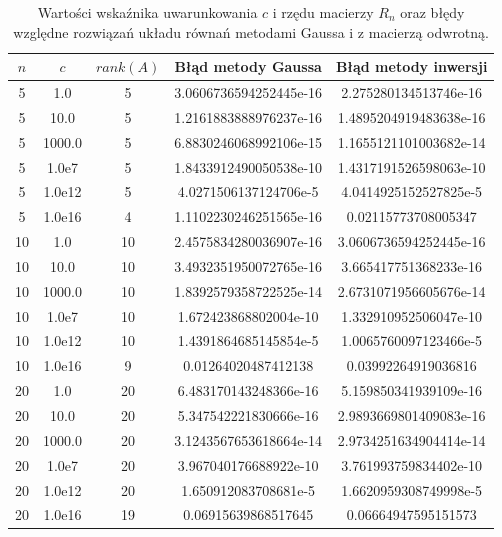 \documentclass{article}
\begin{document}
\begin{table}[H]
\begin{adjustbox}{center}
\begin{tabular}{|c|c|c|c|c|}
    \hline
    $n$ & $c$ & $rank(A)$ & Błąd metody Gaussa & Błąd metody inwersji\\
    \hline
    5 & 1.0 & 5 & 3.0606736594252445e-16 & 2.275280134513746e-16\\
    \hline
    5 & 10.0 & 5 & 1.2161883888976237e-16 & 1.4895204919483638e-16\\
    \hline
    5 & 1000.0 & 5 & 6.8830246068992106e-15 & 1.1655121101003682e-14\\
    \hline
    5 & 1.0e7 & 5 & 1.8433912490050538e-10 & 1.4317191526598063e-10\\
    \hline
    5 & 1.0e12 & 5 & 4.0271506137124706e-5 & 4.0414925152527825e-5\\
    \hline
    5 & 1.0e16 & 4 & 1.1102230246251565e-16 & 0.02115773708005347\\
    \hline
    10 & 1.0 & 10 & 2.4575834280036907e-16 & 3.0606736594252445e-16\\
    \hline
    10 & 10.0 & 10 & 3.4932351950072765e-16 & 3.665417751368233e-16\\
    \hline
    10 & 1000.0 & 10 & 1.8392579358722525e-14 & 2.6731071956605676e-14\\
    \hline
    10 & 1.0e7 & 10 & 1.672423868802004e-10 & 1.332910952506047e-10\\
    \hline
    10 & 1.0e12 & 10 & 1.4391864685145854e-5 & 1.0065760097123466e-5\\
    \hline
    10 & 1.0e16 & 9 & 0.01264020487412138 & 0.03992264919036816\\
    \hline
    20 & 1.0 & 20 & 6.483170143248366e-16 & 5.159850341939109e-16\\
    \hline
    20 & 10.0 & 20 & 5.347542221830666e-16 & 2.9893669801409083e-16\\
    \hline
    20 & 1000.0 & 20 & 3.1243567653618664e-14 & 2.9734251634904414e-14\\
    \hline
    20 & 1.0e7 & 20 & 3.967040176688922e-10 & 3.761993759834402e-10\\
    \hline
    20 & 1.0e12 & 20 & 1.650912083708681e-5 & 1.6620959308749998e-5\\
    \hline
    20 & 1.0e16 & 19 & 0.06915639868517645 & 0.06664947595151573\\
    \hline
\end{tabular}
\end{adjustbox}
\caption{Wartości wskaźnika uwarunkowania $c$ i rzędu macierzy {$R_n$} oraz błędy względne rozwiązań układu równań metodami Gaussa i z macierzą odwrotną.}
\end{table}
\end{document}
